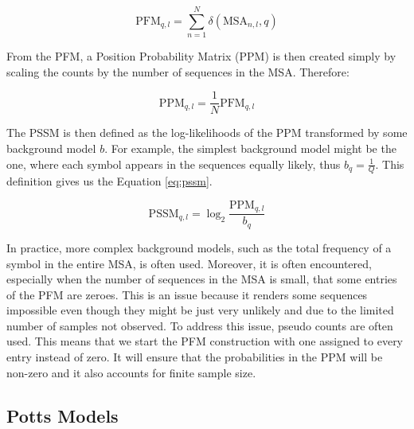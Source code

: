 \begin{equation}
    \text{PFM}_{q, l} = \sum_{n = 1}^{N} \delta(\text{MSA}_{n, l}, q)
    \label{eq:pfm}
\end{equation}

From the PFM, a Position Probability Matrix (PPM) is then created simply by scaling the counts by the number of sequences in the MSA.
Therefore:

\begin{equation}
    \text{PPM}_{q, l} = \frac{1}{N} \text{PFM}_{q, l}
\end{equation}

The PSSM is then defined as the log-likelihoods of the PPM transformed by some background model $b$.
For example, the simplest background model might be the one, where each symbol appears in the sequences equally likely, thus $b_q = \frac{1}{Q}$.
This definition gives us the Equation \ref{eq:pssm}.

\begin{equation}
    \text{PSSM}_{q, l} = \log_2 \frac{\text{PPM}_{q, l}}{b_q}
    \label{eq:pssm}
\end{equation}

In practice, more complex background models, such as the total frequency of a symbol in the entire MSA, is often used.
Moreover, it is often encountered, especially when the number of sequences in the MSA is small, that some entries of the PFM are zeroes.
This is an issue because it renders some sequences impossible even though they might be just very unlikely and due to the limited number of samples not observed.
To address this issue, pseudo counts are often used.
This means that we start the PFM construction with one assigned to every entry instead of zero.
It will ensure that the probabilities in the PPM will be non-zero and it also accounts for finite sample size.

\subsection{Potts Models}


